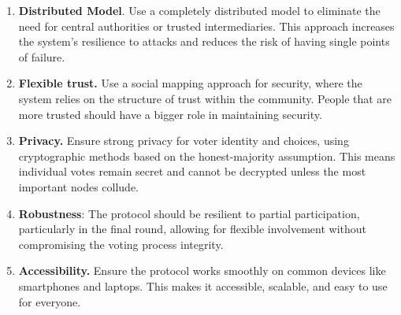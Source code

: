 \documentclass[runningheads]{llncs}
\begin{document}
\begin{enumerate}
    \item \textbf{Distributed Model}. Use a completely distributed model to eliminate the need for central authorities or trusted intermediaries. This approach increases the system's resilience to attacks and reduces the risk of having single points of failure.
    \item \textbf{Flexible trust.} Use a social mapping approach for security, where the system relies on the structure of trust within the community. People that are more trusted should have a bigger role in maintaining security.
    \item \textbf{Privacy.} Ensure strong privacy for voter identity and choices, using cryptographic methods based on the honest-majority assumption. This means individual votes remain secret and cannot be decrypted unless the most important nodes collude.
    \item \textbf{Robustness}: The protocol should be resilient to partial participation, particularly in the final round, allowing for flexible involvement without compromising the voting process integrity.
    \item \textbf{Accessibility.} Ensure the protocol works smoothly on common devices like smartphones and laptops. This makes it accessible, scalable, and easy to use for everyone.
\end{enumerate}


\newcommand{\PartySecretKey}[1]{\ensuremath{s_{#1}}}
\newcommand{\Party}[1]{\ensuremath{P_{#1}}}
\newcommand{\Parties}{\ensuremath{\mathbb{P}}}
\newcommand{\VotesSize}{\ensuremath{|\mathbb{V}}|}

\newcommand{\EncryptionKey}{\textbf{E}}
\newcommand{\DecryptionKey}{\textbf{d}}

\newcommand{\PartialDecryptionKey}[1]{\ensuremath{d_{#1}}}
\newcommand{\PartialEncryptionKey}[1]{\ensuremath{E_{#1}}}

\newcommand{\EncryptedPartialDecryptionKeyShare}[2]{\ensuremath{C_{#1,#2}}}
\newcommand{\SetOfEncryptedPartialDecryptionKeys}{\ensuremath{\mathbb{C}}}
\newcommand{\SetOfFDKG}{\ensuremath{\mathbb{D}}}
\newcommand{\SetOfSharesOfPartialDecryption}{\ensuremath{\mathbb{C}}}

\newcommand{\IthDecryptionKey}[1]{\ensuremath{d_{#1}}}
\newcommand{\IthEncryptionKey}[1]{E_{#1}}

\newcommand{\DecryptionUsingOf}[2]{\ensuremath{\texttt{Dec}_{#1}(#2)}}
\newcommand{\EncryptionUsingOf}[2]{\ensuremath{\texttt{Enc}_{#1}(#2)}}
\end{document}
